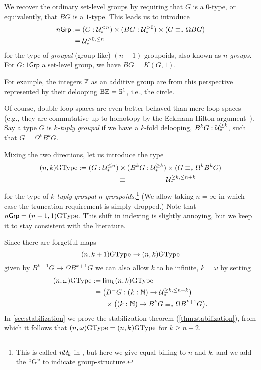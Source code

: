 We recover the ordinary set-level
groups by requiring that $G$ is a $0$-type, or equivalently, that $BG$
is a $1$-type. This leads us to introduce
\begin{align*}
  n\mathsf{Grp}
  &:= (G : \mathcal{U}_\ast^{<n}) \times (BG : \mathcal{U}_\ast^{>0})
    \times (G \equiv_\ast \Omega BG) \\
  &\phantom{:}\equiv \mathcal{U}_\ast^{>0,\le n}
\end{align*}
for the type of \emph{groupal} (group-like) $(n-1)$-groupoids, also known
as \emph{$n$-groups}. For $G:1\mathsf{Grp}$
a set-level group, we have $BG = K(G,1)$.

For example, the integers $\mathbb{Z}$ as an additive group are from this
perspective represented by their delooping $\mathop{\mathrm{B}\mathbb{Z}}={\mathbb{S}}^1$, i.e., the circle.

Of course, double loop spaces are even better behaved than mere loop
spaces (e.g., they are commutative up to homotopy
by the Eckmann-Hilton argument~\cite[Theorem~2.1.6]{TheBook}).
Say a type $G$ is
\emph{$k$-tuply groupal} if we have a $k$-fold delooping,
$B^kG : \mathcal{U}_\ast^{\ge k}$, such that $G = \Omega^kB^kG$.

Mixing the two directions, let us introduce the type
\begin{align*}
  (n,k)\GType
  &:= (G : \UU_\pt^{\le n}) \times (B^kG : \UU_\pt^{\ge k})
    \times (G \equiv_\pt \Omega^kB^kG) \\
  &\omit$\phantom{:}\equiv \UU_\pt^{\ge k,\le n+k}$
\end{align*}
for the type of \emph{$k$-tuply groupal $n$-groupoids}.\footnote{This
  is called $n\mathcal{U}_k$ in \cite{BaezDolan1998}, but here we give equal
  billing to $n$ and $k$,
  and we add the ``G'' to indicate group-structure.}
(We allow taking $n=\infty$ in which case the truncation requirement
is simply dropped.)
Note that $n\mathsf{Grp} = (n-1,1)\mathrm{GType}$. This shift in indexing is slightly
annoying, but we keep it to stay consistent with the literature.

Since there are forgetful maps
\begin{equation*}
(n,k+1)\mathrm{GType} \to (n,k)\mathrm{GType}
\end{equation*}
given by $B^{k+1}G\mapsto \Omega B^{k+1}G$
we can also allow $k$ to be infinite, $k=\omega$ by setting
\begin{align*}
(n,\omega)\mathrm{GType} & := \mathsf{lim}_k{}(n,k)\mathrm{GType} \\
&\phantom{:}\equiv \bigl(B^{-}G : (k : {\mathbb{N}}) \to \mathcal{U}_\ast^{\ge k,\le n+k}\bigr) \\
  &\qquad \times \bigl((k : {\mathbb{N}}) \to B^kG \equiv_\ast \Omega B^{k+1}G \bigr).
\end{align*}
In \autoref{sec:stabilization} we prove the stabilization theorem
(\autoref{thm:stabilization}), from which it follows that
$(n,\omega)\mathrm{GType}=(n,k)\mathrm{GType}$ for $k\geq n+2$.

